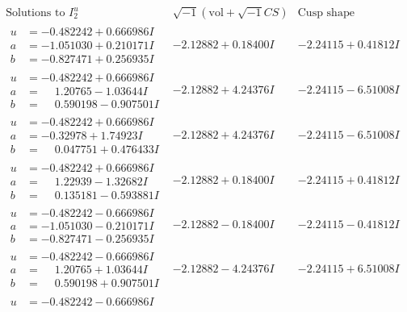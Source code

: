 \documentclass[1p]{elsarticle_modified}
\theoremstyle{definition}
\newcommand{\I}{\sqrt{-1}}
\begin{document}
$$\begin{array}{c|c|c}  
\text{Solutions to }I^u_{2}& \I (\text{vol} + \sqrt{-1}CS) & \text{Cusp shape}\\
 \hline 
\begin{aligned}
u &= -0.482242 + 0.666986 I \\
a &= -1.051030 + 0.210171 I \\
b &= -0.827471 + 0.256935 I\end{aligned}
 & -2.12882 + 0.18400 I & -2.24115 + 0.41812 I \\ \hline\begin{aligned}
u &= -0.482242 + 0.666986 I \\
a &= \phantom{-}1.20765 - 1.03644 I \\
b &= \phantom{-}0.590198 - 0.907501 I\end{aligned}
 & -2.12882 + 4.24376 I & -2.24115 - 6.51008 I \\ \hline\begin{aligned}
u &= -0.482242 + 0.666986 I \\
a &= -0.32978 + 1.74923 I \\
b &= \phantom{-}0.047751 + 0.476433 I\end{aligned}
 & -2.12882 + 4.24376 I & -2.24115 - 6.51008 I \\ \hline\begin{aligned}
u &= -0.482242 + 0.666986 I \\
a &= \phantom{-}1.22939 - 1.32682 I \\
b &= \phantom{-}0.135181 - 0.593881 I\end{aligned}
 & -2.12882 + 0.18400 I & -2.24115 + 0.41812 I \\ \hline\begin{aligned}
u &= -0.482242 - 0.666986 I \\
a &= -1.051030 - 0.210171 I \\
b &= -0.827471 - 0.256935 I\end{aligned}
 & -2.12882 - 0.18400 I & -2.24115 - 0.41812 I \\ \hline\begin{aligned}
u &= -0.482242 - 0.666986 I \\
a &= \phantom{-}1.20765 + 1.03644 I \\
b &= \phantom{-}0.590198 + 0.907501 I\end{aligned}
 & -2.12882 - 4.24376 I & -2.24115 + 6.51008 I \\ \hline\begin{aligned}
u &= -0.482242 - 0.666986 I \\

\end{aligned}
\end{array}$$
\end{document}
